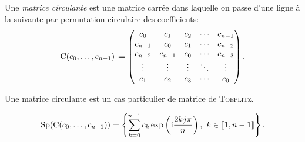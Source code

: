 \begin{defi}
Une \emph{matrice circulante} est une matrice carrée dans laquelle on passe d'une ligne à la suivante par permutation circulaire des coefficients:
$$
\mathrm{C}(c_0, \dots, c_{n-1}) \defeq
\begin{pmatrix}
c_0 & c_1 & c_2 & \cdots & c_{n-1} \\
c_{n-1} & c_0 & c_1 & \cdots & c_{n-2} \\
c_{n-2} & c_{n-1} & c_0 & \cdots & c_{n-3} \\
\vdots & \vdots & \vdots & \ddots & \vdots \\
c_1 & c_2 & c_3 & \cdots & c_0
\end{pmatrix}.
$$
\end{defi}

\begin{remarque}
    Une matrice circulante est un cas particulier de matrice de \textsc{Toeplitz}.
\end{remarque}

\begin{prop}
    $$\mathrm{Sp}(\mathrm{C}(c_0, \dots, c_{n-1})) = \left \{ \sum_{k=0}^{n-1} c_k \exp \left( \mathrm{i} \frac{2kj \pi}{n} \right),\ k \in \llbracket 1, n-1 \rrbracket \right \}.$$
\end{prop}

